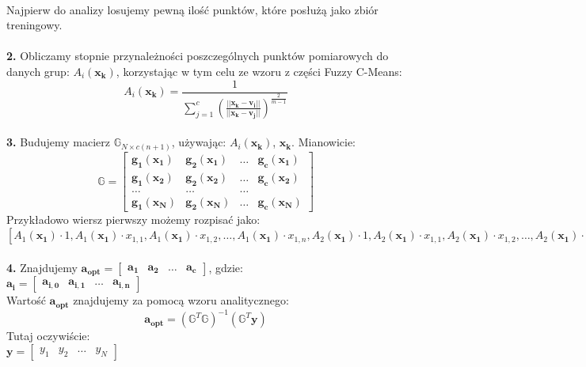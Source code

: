 \documentclass[10pt,a4paper]{article}
\begin{document}
\paragraph{}
Najpierw do analizy losujemy pewną ilość punktów, które posłużą jako zbiór treningowy. 

\paragraph{}
\textbf{2.} Obliczamy stopnie przynależności poszczególnych punktów pomiarowych do danych grup: $A_i(\bm{x_k})$, korzystając w tym celu ze wzoru z części Fuzzy C-Means:
\[A_i(\bm{x_k}) = \frac{1}{\sum_{j = 1}^{c} \left(\frac{||\bm{x_k} - \bm{v_i}||}{||\bm{x_k} - \bm{v_j}||}\right)^{\frac{2}{m - 1}}}\]

\paragraph{}
\textbf{3.} Budujemy macierz $\mathbb{G}_{N \times c(n + 1)}$, używając: $A_i(\bm{x_k})$, $\bm{x_k}$. Mianowicie:
\[ \mathbb{G} = \begin{bmatrix} \bm{g_1}(\bm{x_1})& \bm{g_2}(\bm{x_1}) & \ldots & \bm{g_c}(\bm{x_1})\\ \bm{g_1}(\bm{x_2})& \bm{g_2}(\bm{x_2}) & \ldots & \bm{g_c}(\bm{x_2}) \\ \ldots & \ldots & \ldots \\ \bm{g_1}(\bm{x_N})& \bm{g_2}(\bm{x_N}) & \ldots & \bm{g_c}(\bm{x_N}) \end{bmatrix} \]
Przykładowo wiersz pierwszy możemy rozpisać jako:\\
$ [A_1(\bm{x_1}) \cdot 1 , A_1(\bm{x_1}) \cdot x_{1,1} , A_1(\bm{x_1}) \cdot x_{1,2} , \ldots , A_1(\bm{x_1}) \cdot x_{1,n} , A_2(\bm{x_1}) \cdot 1 , A_2(\bm{x_1}) \cdot x_{1,1} , A_2(\bm{x_1}) \cdot x_{1,2} , \ldots , A_2(\bm{x_1}) \cdot x_{1,n} , \ldots , \ldots , \ldots , \ldots , \ldots , A_c(\bm{x_1}) \cdot 1 , A_c(\bm{x_1}) \cdot x_{1,1} , A_c(\bm{x_1}) \cdot x_{1,2} , \ldots , A_c(\bm{x_1}) \cdot x_{1,n} ]  $

\paragraph{}
\textbf{4.} Znajdujemy $\bm{a_{opt}} = \begin{bmatrix} \bm{a_1} & \bm{a_2} & \ldots & \bm{a_c} \end{bmatrix}$, gdzie:\\
$\bm{a_i} = \begin{bmatrix} \bm{a_{i, 0}} & \bm{a_{i, 1}} & \ldots & \bm{a_{i, n}} \end{bmatrix}$\\
Wartość $\bm{a_{opt}}$ znajdujemy za pomocą wzoru analitycznego:
\[ \bm{a_{opt}} = (\mathbb{G}^T \mathbb{G})^{-1} (\mathbb{G}^T \bm{y}) \]
Tutaj oczywiście:\\
$\bm{y} = \begin{bmatrix} y_1 & y_2 & \ldots & y_N \end{bmatrix}$
\end{document}
